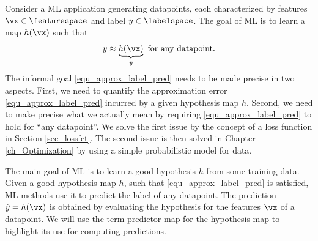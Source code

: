 \documentclass[12pt]{report}
\begin{document}
Consider a ML application generating datapoints, each characterized 
by features $\vx \in \featurespace$ and label $y \in \labelspace$. The goal 
of ML is to learn a map $h(\vx)$ such that 
\begin{equation} 
\label{equ_approx_label_pred}
y \approx \underbrace{h(\vx)}_{\hat{y}} \mbox{ for any datapoint}. 
\end{equation}  
The informal goal \eqref{equ_approx_label_pred} needs to be made precise 
in two aspects. First, we need to quantify the approximation error \eqref{equ_approx_label_pred} 
incurred by a given hypothesis map $h$. Second, we need to make precise 
what we actually mean by requiring \eqref{equ_approx_label_pred} to hold 
for ``any datapoint''. We solve the first issue by the concept of a loss 
function in Section \ref{sec_lossfct}. The second issue is then solved 
in Chapter \ref{ch_Optimization} by using a simple probabilistic model 
for data. 



%

The main goal of ML is to learn a good hypothesis $h$ from some training data. 
Given a good hypothesis map $h$, such that \eqref{equ_approx_label_pred} 
is satisfied, ML methods use it to predict the label of any datapoint. 
The prediction $\hat{y}=h(\vx)$ is obtained by evaluating the hypothesis 
for the features $\vx$ of a datapoint. We will use the term predictor map 
for the hypothesis map to highlight its use for computing predictions. 
\end{document}
